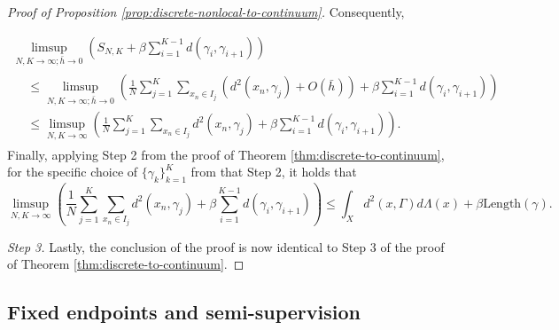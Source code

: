 \documentclass[aos, preprint]{imsart}
\theoremstyle{plain}
\theoremstyle{remark}
\begin{document}
\begin{appendix}
\begin{proof}[Proof of Proposition \ref{prop:discrete-nonlocal-to-continuum}]
Consequently,

\begin{multline*}
\limsup_{N,K\rightarrow\infty;\bar{h}\rightarrow0}\left(
 S_{N,K}+\beta\sum_{i=1}^{K-1}d(\gamma_{i},\gamma_{i+1})\right)\\
\begin{aligned}
&
\leq\limsup_{N,K\rightarrow\infty;\bar{h}\rightarrow0}\left(\frac{1}{N}\sum_{j=1}^{K}\sum_{x_{n}\in I_{j}}\left(d^{2}(x_{n},\gamma_{j})+
O(\bar h)
\right)
+\beta\sum_{i=1}^{K-1}d(\gamma_{i},\gamma_{i+1})\right)\\
 & \leq\limsup_{N,K\rightarrow\infty}\left(\frac{1}{N}\sum_{j=1}^{K}\sum_{x_{n}\in I_{j}}d^{2}(x_{n},\gamma_{j})+\beta\sum_{i=1}^{K-1}d(\gamma_{i},\gamma_{i+1})\right).
\end{aligned}
\end{multline*}
Finally, applying Step 2 from the proof of Theorem \ref{thm:discrete-to-continuum}, for the specific choice of $\{\gamma_k\}_{k=1}^K$ from that Step 2, it holds that
\[
\limsup_{N,K\rightarrow \infty}\left(\frac{1}{N}\sum_{j=1}^{K}\sum_{x_{n}\in I_{j}}d^{2}(x_{n},\gamma_{j})+\beta\sum_{i=1}^{K-1}d(\gamma_{i},\gamma_{i+1})\right)\leq\int_{X}d^{2}(x,\Gamma)d\Lambda(x)+\beta\text{Length}(\gamma).
\]

\medskip


 \emph{Step 3.}
Lastly, the conclusion of the proof is now identical to Step 3 of the proof of Theorem \ref{thm:discrete-to-continuum}.
\end{proof}

\newpage

\subsection{Fixed endpoints and semi-supervision}


\end{appendix}
\end{document}
